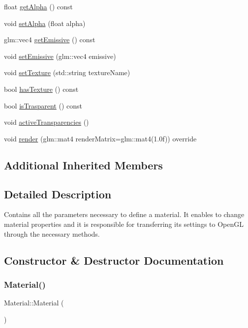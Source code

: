 \begin{DoxyCompactItemize}
float \hyperlink{classMaterial_a85d93ae12ca34b523b6913ed259581bb}{get\+Alpha} () const
\item 
void \hyperlink{classMaterial_a24b7ebf7ebf1236fc96adabade4d014e}{set\+Alpha} (float alpha)
\item 
glm\+::vec4 \hyperlink{classMaterial_a11b302faa194dbf7689a1371640ef0d5}{get\+Emissive} () const
\item 
void \hyperlink{classMaterial_ac07ec3f5cf25dfce5a58637d798c8a18}{set\+Emissive} (glm\+::vec4 emissive)
\item 
void \hyperlink{classMaterial_a4f41c753bbd579a4bcbb1d46f085ad3f}{set\+Texture} (std\+::string texture\+Name)
\item 
bool \hyperlink{classMaterial_af799317a93672f4ffb2fed70bdb7e607}{has\+Texture} () const
\item 
bool \hyperlink{classMaterial_a8e276604d5e764567c85cd770e8df8a7}{is\+Trasparent} () const
\item 
void \hyperlink{classMaterial_ae2506a2546ec45c89d55db14e4e31aaf}{active\+Transparencies} ()
\item 
void \hyperlink{classMaterial_ada83b9344f974994cd495b8ecda8b049}{render} (glm\+::mat4 render\+Matrix=glm\+::mat4(1.\+0f)) override
\end{DoxyCompactItemize}
\subsection*{Additional Inherited Members}


\subsection{Detailed Description}
Contains all the parameters necessary to define a material. It enables to change material properties and it is responsible for transferring its settings to Open\+GL through the necessary methods. 

\subsection{Constructor \& Destructor Documentation}
\mbox{\label{classMaterial_a137e987401b63eb7c6c27c3e38bc74b5}} 
\subsubsection{\texorpdfstring{Material()}{Material()}}
{\footnotesize\ttfamily Material\+::\+Material (\begin{DoxyParamCaption}{ }\end{DoxyParamCaption})}

